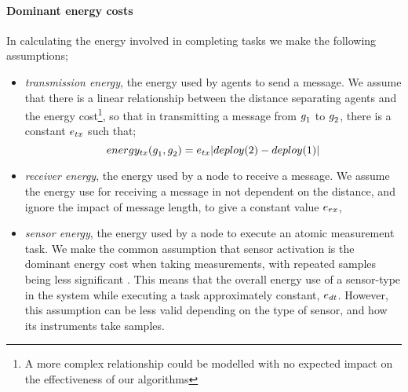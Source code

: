 \paragraph{Dominant energy costs}
\label{section:problem:dominant_energy_costs}
\newcommand{\formalTransmissionEnergy}[2]{
	\functionFormal{energy_{\symbolTransmission{}{}}}
	{\setAgent{}{} \times \setAgent{}{}}
	{\setRealNumbersPositive{}{}}
}
\newcommand{\functionTransmissionEnergy}[2]{
	\functionSignature{energy_{\symbolTransmission{}{}}}
	{\varAgent{#1}{},\varAgent{#2}{}}
}
\newcommand{\functionTransmissionEnergyIndexed}[2]{
	\functionTransmissionEnergy{\varAgent{i}{}}{\varAgent{i+1}{}}
}
\newcommand{\functionTransmissionEnergySink}[2]{
	\functionSignature{energy_{\symbolTransmission{}{}}}
	{\functionSinkRoleAtomic{}{},\varAgent{2}{}}
}
\newcommand{\functionTransmissionEnergyRelay}[2]{
	\functionSignature{energy_{\symbolTransmission{}{}}}
	{\varAgent{#1}{},\varAgent{#2}{}}
}
\newcommand{\functionTransmissionEnergyDetector}[2]{
	\functionSignature{energy_{\symbolTransmission{}{}}}
	{\varAgent{#1}{},\varAgent{#2}{}}
}
In calculating the energy involved in completing tasks we make the following assumptions;
\begin{itemize}
	\item \textit{transmission energy}, the energy used by agents to send a message. We assume that there is a linear relationship between the distance separating agents and the energy cost\footnote{A more complex relationship could be modelled with no expected impact on the effectiveness of our algorithms}, so that in transmitting a message from $g_{1}^{}$ to $g_{2}^{}$, there is a constant $\varTransmissionEnergy{}{}$ such that;
	\begin{equation}
		\functionTransmissionEnergy{1}{2}
		=  \varTransmissionEnergy{}{}\funcSize{\functionDeployment{2}{} - \functionDeployment{1}{}}
	\end{equation}
	\item \textit{receiver energy}, the energy used by a node to receive a message. We assume the energy use for receiving a message in not dependent on the distance, and ignore the impact of message length, to give a constant value $\varReceiverEnergy{}{}$, 
	\item \textit{sensor energy}, the energy used by a node to execute an atomic measurement task. We make the common assumption that sensor activation is the dominant energy cost when taking measurements, with repeated samples being less significant \citep{Razzaque2014}. This means that the overall energy use of a sensor-type in the system while executing a task approximately constant, $\varSensorEnergy{}{}$. However, this assumption can be less valid depending on the type of sensor, and how its instruments take samples.
\end{itemize}
